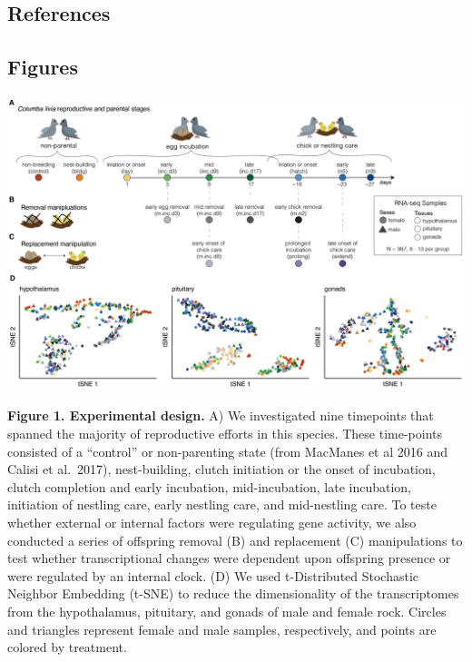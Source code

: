 \hypertarget{references}{%
\subsection{References}\label{references}}



\newpage

\hypertarget{figures}{%
\subsection{Figures}\label{figures}}

\includegraphics[width=0.95\linewidth]{fig1-1}

\textbf{Figure 1. Experimental design.} A) We investigated nine
timepoints that spanned the majority of reproductive efforts in this
species. These time-points consisted of a ``control'' or non-parenting
state (from MacManes et al 2016 and Calisi et al.~2017), nest-building,
clutch initiation or the onset of incubation, clutch completion and
early incubation, mid-incubation, late incubation, initiation of
nestling care, early nestling care, and mid-nestling care. To teste
whether external or internal factors were regulating gene activity, we
also conducted a series of offspring removal (B) and replacement (C)
manipulations to test whether transcriptional changes were dependent
upon offspring presence or were regulated by an internal clock. (D) We
used t-Distributed Stochastic Neighbor Embedding (t-SNE) to reduce the
dimensionality of the transcriptomes from the hypothalamus, pituitary,
and gonads of male and female rock. Circles and triangles represent
female and male samples, respectively, and points are colored by
treatment.

